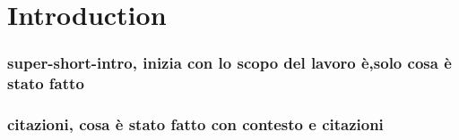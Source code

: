 
\chapter{Introduction}

\begin{comment}
l'intro ha una sua struttura, in 3 parti (sigh ho già scritto questa 
storia decine di volte, ma mai in generale per darla poi come lettura 
a chi deve fare l'intro per la prima volta): da 0.5 a 1 pagina di super-short-intro, 
questa parte non ho citazioni biblio, inizia con la stringa "scopo di questo lavoro è" 
e dice solo cosa è stato fatto. 
la seconda parte è quella corposa (massomeno da 2 
a 5 pagine) e "gronda citrazioni" e descrive cosa è stato fatto dando anche il contesto
(che ovviamente non ci sta in 0.5 - 1 pagina). la terza parte è la solita cavolata 
dell'indice in forma discorsiva (nel capitolo x si descrive questo e quello..., e così via)

\end{comment}

\subsection*{super-short-intro, inizia con lo scopo del lavoro è,solo cosa è stato fatto}
\subsection*{citazioni, cosa è stato fatto con contesto e citazioni}
